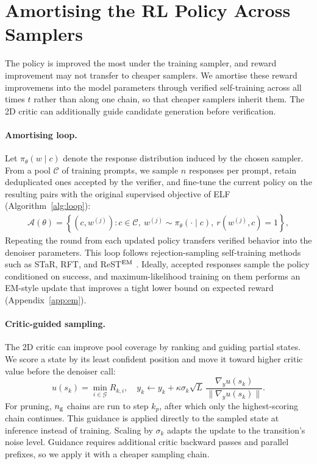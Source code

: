 \section{Amortising the RL Policy Across Samplers}
\label{sec:loop}

The policy is improved the most under the training sampler, and reward improvement may not transfer to cheaper samplers. We amortise these reward improvemens into the model parameters through verified self-training across all times $t$ rather than along one chain, so that cheaper samplers inherit them. The 2D critic can additionally guide candidate generation before verification.

\paragraph{Amortising loop.} Let $\pi_\theta(w\mid c)$ denote the response distribution induced by the chosen sampler. From a pool $\mathcal C$ of training prompts, we sample $n$ responses per prompt, retain deduplicated ones accepted by the verifier, and fine-tune the current policy on the resulting pairs with the original supervised objective of ELF \citep{hu2026elf} (Algorithm~\ref{alg:loop}):
\begin{align}
\mathcal A(\theta)
=
\left\{
(c,w^{(j)}):
c\in\mathcal C,\ 
w^{(j)}\sim\pi_\theta(\cdot\mid c),\
r(w^{(j)},c)=1
\right\},
\label{eq:accept}
\end{align}
Repeating the round from each updated policy transfers verified behavior into the denoiser parameters. This loop follows rejection-sampling self-training methods such as STaR, RFT, and ReST$^{\rm EM}$ \citep{zelikman2022star,yuan2023rft,singh2023restem}. Ideally, accepted responses sample the policy conditioned on success, and maximum-likelihood training on them performs an EM-style update that improves a tight lower bound on expected reward (Appendix~\ref{app:em}).


\paragraph{Critic-guided sampling.}
The 2D critic can improve pool coverage by ranking and guiding partial states. We score a state by its least confident position and move it toward higher critic value before the denoiser call:
\begin{equation}
u(s_k)
=
\min_{i\in\mathcal G}
R_{k,i}, \quad 
y_k
\leftarrow
y_k
+
\kappa\sigma_k\sqrt L\,
\frac{\nabla_yu(s_k)}
     {\|\nabla_yu(s_k)\|}.
\label{eq:minscore}
\end{equation}
For pruning, $n_{\rm g}$ chains are run to step $k_p$, after which only the highest-scoring chain continues. This guidance is applied directly to the sampled state at inference instead of training. Scaling by $\sigma_k$ adapts the update to the transition's noise level. Guidance requires additional critic backward passes and parallel prefixes, so we apply it with a cheaper sampling chain. 

